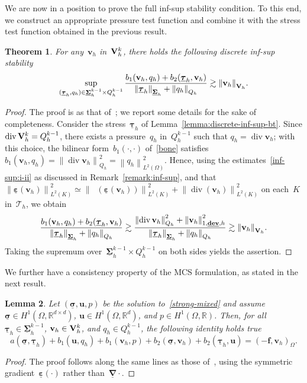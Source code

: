 \documentclass[a4paper,twoside,10pt]{article}
\theoremstyle{plain}
\newtheorem{theorem}{Theorem}[section]
\newtheorem{lemma}[theorem]{Lemma}
\theoremstyle{remark}
\theoremstyle{definition}
\numberwithin{equation}{section}
\numberwithin{figure}{section}
\newcommand{\Norm}[1]{{\left\|{#1} \right\|}}
\newcommand{\Tauh}{\mathcal{T}_h}
\newcommand{\Rbb}{\mathbb{R}}
\newcommand{\Rbbd}{\mathbb{R}^d}
\newcommand{\Rbbdd}{\mathbb{R}^{d\times d}}
\newcommand{\K}{K}
\newcommand{\Sigmah}{\underline{\boldsymbol{\Sigma}}_h}
\newcommand{\Sigmahkmo}{\Sigmah^{k-1}}
\newcommand{\Vh}{{\bf{V}}_h}
\newcommand{\Vhk}{\Vh^k}
\newcommand{\Qh}{Q_h}
\newcommand{\Qhkmo}{\Qh^{k-1}}
\newcommand{\taubfh}{\underline{\boldsymbol{\tau}}_h}
\newcommand{\vbfh}{\mathbf{v}_h}
\newcommand{\qh}{q_h}
\newcommand{\sigmabf}{\underline{\boldsymbol{\sigma}}}
\newcommand{\ubf}{\mathbf{u}}
\DeclareMathOperator{\dive}{div}
\DeclareMathOperator{\dev}{\underline{\mathbf{dev}}}
\newcommand{\Ltwo}{L^2}
\newcommand{\LtwoOmega}{\Ltwo(\Omega)}
\newcommand{\fbf}{\mathbf{f}}
\newcommand{\bone}{b_1}
\newcommand{\btwo}{b_2}
\newcommand{\epsbfun}{\underline{\boldsymbol{\varepsilon}}}
\newcommand{\nablabfun}{\underline{\boldsymbol{\nabla}}}
\begin{document}
We are now in a position to prove the full inf-sup stability condition.
To this end,
we construct an appropriate pressure test function
and combine it with the stress test function obtained in the previous result.
\begin{theorem} \label{theorem:inf-sup-bone-btwo}
For any~$\vbfh$ in~$\Vhk$,
there holds the following discrete inf-sup stability
\begin{equation*}
\sup_{(\taubfh,\qh)\in\Sigmahkmo\times\Qhkmo} \frac{\bone(\vbfh,\qh) + \btwo(\taubfh,\vbfh)}{\Norm{\taubfh}_{\Sigmah} + \Norm{\qh}_{\Qh}}
    \gtrsim \Norm{\vbfh}_{\Vh}.
\end{equation*}
\end{theorem}
\begin{proof}
The proof is as that of~\cite[Thm~6.1]{Gopalakrishnan-Lederer-Schoberl:2020};
we report some details for the sake of completeness.
Consider the stress~$\taubfh$ of Lemma~\ref{lemma:discrete-inf-sup-bt}.
Since $\dive\Vhk = \Qhkmo$,
there exists a pressure~$\qh$ in~$\Qhkmo$ such that
$\qh = \dive\vbfh$;
with this choice,
the bilinear form~$\bone(\cdot,\cdot)$ of~\eqref{bone} satisfies
$\bone(\vbfh,\qh) = \Norm{\dive\vbfh}_{\Qh}^2 = \Norm{\qh}_{\LtwoOmega}^2$.
Hence,
using the estimates~\eqref{inf-sup:i-ii}
as discussed in Remark~\ref{remark:inf-sup},
and that
$\Norm{\epsbfun(\vbfh)}^2_{\Ltwo(\K)} \simeq \Norm{\dev(\epsbfun(\vbfh))}^2_{\Ltwo(\K)} + \Norm{\dive(\vbfh)}^2_{\Ltwo(\K)}$
on each~$\K$ in~$\Tauh$,
we obtain
\begin{equation*}
\frac{\bone(\vbfh,\qh)+\btwo(\taubfh,\vbfh)}{\Norm{\taubfh}_{\Sigmah} + \Norm{\qh}_{\Qh}}
\gtrsim \frac{\Norm{\dive\vbfh}_{\Qh}^2+\Norm{\vbfh}_{1,\dev,h}^2}{\Norm{\taubfh}_{\Sigmah} + \Norm{\qh}_{\Qh}}
\gtrsim \Norm{\vbfh}_{\Vh}.
\end{equation*}
Taking the supremum over~$\Sigmahkmo\times\Qhkmo$ on both sides yields the assertion.
\end{proof}

We further have a consistency property of the MCS formulation,
as stated in the next result.
\begin{lemma} \label{lemma:consistency}
Let $(\sigmabf,\ubf,p)$ be the solution to~\eqref{strong-mixed}
and assume $\sigmabf \in H^1(\Omega,\Rbbdd)$, $\ubf \in H^1(\Omega,\Rbbd)$, and $p \in H^1(\Omega,\Rbb)$.
Then,
for all $\taubfh \in \Sigmahkmo$, $\vbfh \in \Vhk$, and $\qh \in \Qhkmo$,
the following identity holds true
\begin{equation*}
a(\sigmabf,\taubfh) + \bone(\ubf,\qh) + \bone(\vbfh,p) + \btwo(\sigmabf,\vbfh) + \btwo(\taubfh,\ubf)
    = (-\fbf,\vbfh)_{\Omega}.
\end{equation*}
\end{lemma}
\begin{proof}
The proof follows along the same lines as those of~\cite[Thm~6.2]{Gopalakrishnan-Lederer-Schoberl:2020},
using the symmetric gradient~$\epsbfun(\cdot)$ rather than~$\nablabfun\cdot$.
\end{proof}
\end{document}
